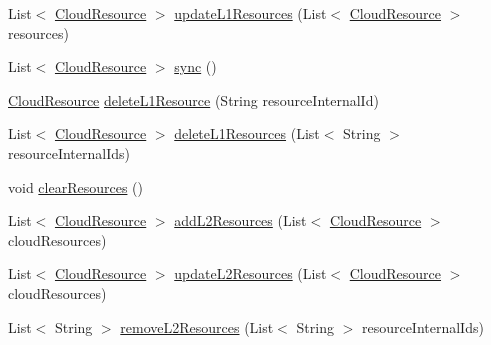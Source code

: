 \begin{DoxyCompactItemize}
\item 
List$<$ \hyperlink{classeu_1_1h2020_1_1symbiote_1_1cloud_1_1model_1_1internal_1_1CloudResource}{Cloud\+Resource} $>$ \hyperlink{classeu_1_1h2020_1_1symbiote_1_1client_1_1feign_1_1FeignRHClient_ab915fafbde1cb56c856abac918cc9de4}{update\+L1\+Resources} (List$<$ \hyperlink{classeu_1_1h2020_1_1symbiote_1_1cloud_1_1model_1_1internal_1_1CloudResource}{Cloud\+Resource} $>$ resources)
\item 
List$<$ \hyperlink{classeu_1_1h2020_1_1symbiote_1_1cloud_1_1model_1_1internal_1_1CloudResource}{Cloud\+Resource} $>$ \hyperlink{classeu_1_1h2020_1_1symbiote_1_1client_1_1feign_1_1FeignRHClient_a8181d6656e2c7dea2d01bc5ee16e8639}{sync} ()
\item 
\hyperlink{classeu_1_1h2020_1_1symbiote_1_1cloud_1_1model_1_1internal_1_1CloudResource}{Cloud\+Resource} \hyperlink{classeu_1_1h2020_1_1symbiote_1_1client_1_1feign_1_1FeignRHClient_aef7c169c970267f47e7c56812c9a7422}{delete\+L1\+Resource} (String resource\+Internal\+Id)
\item 
List$<$ \hyperlink{classeu_1_1h2020_1_1symbiote_1_1cloud_1_1model_1_1internal_1_1CloudResource}{Cloud\+Resource} $>$ \hyperlink{classeu_1_1h2020_1_1symbiote_1_1client_1_1feign_1_1FeignRHClient_ae56343520532a4d10423bfa99d49787f}{delete\+L1\+Resources} (List$<$ String $>$ resource\+Internal\+Ids)
\item 
void \hyperlink{classeu_1_1h2020_1_1symbiote_1_1client_1_1feign_1_1FeignRHClient_adff80519c8c1228b16677a7ea1112079}{clear\+Resources} ()
\item 
List$<$ \hyperlink{classeu_1_1h2020_1_1symbiote_1_1cloud_1_1model_1_1internal_1_1CloudResource}{Cloud\+Resource} $>$ \hyperlink{classeu_1_1h2020_1_1symbiote_1_1client_1_1feign_1_1FeignRHClient_abec39dd163ece294b6c4288a81980e10}{add\+L2\+Resources} (List$<$ \hyperlink{classeu_1_1h2020_1_1symbiote_1_1cloud_1_1model_1_1internal_1_1CloudResource}{Cloud\+Resource} $>$ cloud\+Resources)
\item 
List$<$ \hyperlink{classeu_1_1h2020_1_1symbiote_1_1cloud_1_1model_1_1internal_1_1CloudResource}{Cloud\+Resource} $>$ \hyperlink{classeu_1_1h2020_1_1symbiote_1_1client_1_1feign_1_1FeignRHClient_ae87c958e721ee8f5144822c10dd40095}{update\+L2\+Resources} (List$<$ \hyperlink{classeu_1_1h2020_1_1symbiote_1_1cloud_1_1model_1_1internal_1_1CloudResource}{Cloud\+Resource} $>$ cloud\+Resources)
\item 
List$<$ String $>$ \hyperlink{classeu_1_1h2020_1_1symbiote_1_1client_1_1feign_1_1FeignRHClient_a2a7432c5df835ea79f3b5f1f4aec99bf}{remove\+L2\+Resources} (List$<$ String $>$ resource\+Internal\+Ids)

\end{DoxyCompactItemize}
